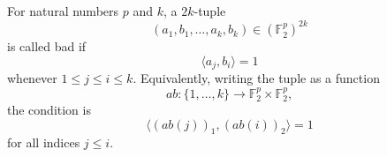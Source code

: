 \begin{definition}
For natural numbers \(p\) and \(k\), a \(2k\)-tuple
\[
  (a_1,b_1,\ldots,a_k,b_k)\in(\mathbb F_2^p)^{2k}
\]
is called bad if
\[
  \langle a_j,b_i\rangle=1
\]
whenever \(1\le j\le i\le k\). Equivalently, writing the tuple as a function
\[
  ab:\{1,\ldots,k\}\to \mathbb F_2^p\times\mathbb F_2^p,
\]
the condition is
\[
  \langle (ab(j))_1,(ab(i))_2\rangle=1
\]
for all indices \(j\le i\).
\end{definition}
